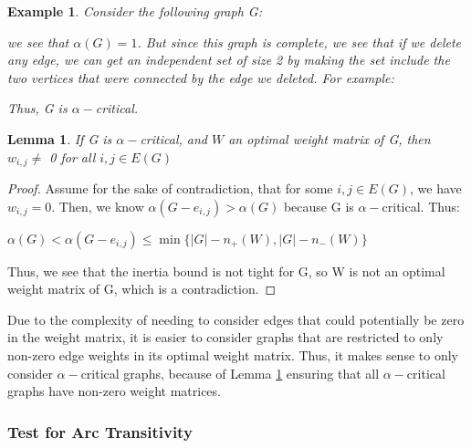 \documentclass[12pt]{article}
\theoremstyle{parenbold}
\newtheorem{exmp}{Example}[section]
\newtheorem{lemma}{Lemma}[section]
\begin{document}
\begin{exmp}
Consider the following graph G:


we see that $\alpha(G) = 1$. But since this graph is complete, we see that if we delete any edge, we can get an independent set of size 2 by making the set include the two vertices that were connected by the edge we deleted. For example:


Thus, G is $\alpha-$critical.
\end{exmp}

\begin{lemma}
\label{alpha}
If G is $\alpha-$critical, and $W$ an optimal weight matrix of G, then $w_{i,j} \neq$ 0 for all $i,j \in E(G)$
\end{lemma} 
\begin{proof}
Assume for the sake of contradiction, that for some $i,j \in E(G)$, we have $w_{i,j} = 0$. Then, we know $\alpha(G-e_{i,j}) > \alpha(G)$ because G is $\alpha-$critical. Thus:

$\alpha(G) < \alpha(G-e_{i,j}) \leq \min\{|G| - n_+(W),|G| - n_-(W)\}$

Thus, we see that the inertia bound is not tight for G, so W is not an optimal weight matrix of G, which is a contradiction.
\end{proof}

Due to the complexity of needing to consider edges that could potentially be zero in the weight matrix, it is easier to consider graphs that are restricted to only non-zero edge weights in its optimal weight matrix. Thus, it makes sense to only consider $\alpha-$critical graphs, because of Lemma \ref{alpha} ensuring that all $\alpha-$critical graphs have non-zero weight matrices.

\subsubsection{Test for Arc Transitivity}
\end{document}
